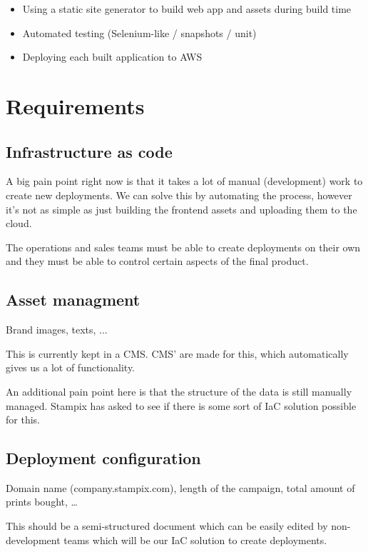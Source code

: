 \begin{itemize}
	\item Using a static site generator to build web app and assets during build time
	\item Automated testing (Selenium-like / snapshots / unit)
	\item Deploying each built application to AWS
\end{itemize}

\section{Requirements}

\subsection{Infrastructure as code}

A big pain point right now is that it takes a lot of manual (development) work to create new deployments.
We can solve this by automating the process, however it's not as simple as just building the frontend assets and uploading them to the cloud.

The operations and sales teams must be able to create deployments on their own and they must be able to control certain aspects of the final product.


\subsection{Asset managment}

Brand images, texts, ...

This is currently kept in a CMS. CMS' are made for this, which automatically gives us a lot of functionality. 

An additional pain point here is that the structure of the data is still manually managed. Stampix has asked to see if there is some sort of IaC solution possible for this.

\subsection{Deployment configuration}

Domain name (company.stampix.com), length of the campaign, total amount of prints bought, \dots

This should be a semi-structured document which can be easily edited by non-development teams which will be our IaC solution to create deployments.

